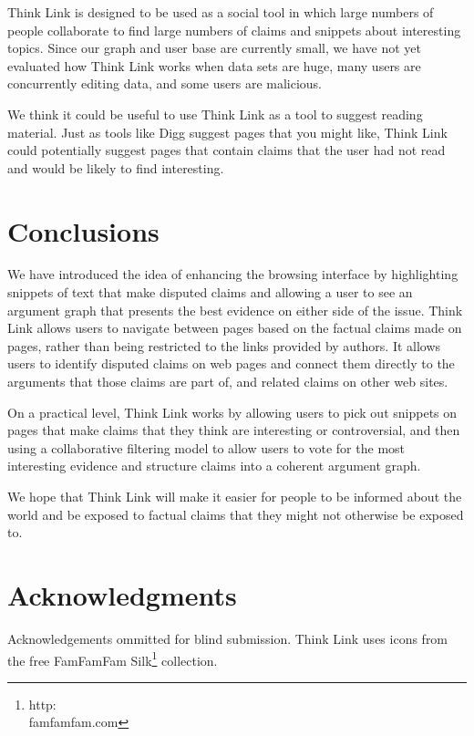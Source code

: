 \documentclass{chi2009}
\newcommand{\todo}[1]{}
\begin{document}
Think Link is designed to be used as a social tool in which large numbers of people collaborate to find large numbers of claims and snippets about interesting topics. Since our graph and user base are currently small, we have not yet evaluated how Think Link works when data sets are huge, many users are concurrently editing data, and some users are malicious.

We think it could be useful to use Think Link as a tool to suggest reading material. Just as tools like Digg suggest pages that you might like, Think Link could potentially suggest pages that contain claims that the user had not read and would be likely to find interesting.

\section{Conclusions}

We have introduced the idea of enhancing the browsing interface by highlighting snippets of text that make disputed claims and allowing a user to see an argument graph that presents the best evidence on either side of the issue. Think Link allows users to navigate between pages based on the factual claims made on pages, rather than being restricted to the links provided by authors. It allows users to identify disputed claims on web pages and connect them directly to the arguments that those claims are part of, and related claims on other web sites.

On a practical level, Think Link works by allowing users to pick out snippets on pages that make claims that they think are interesting or controversial, and then using a collaborative filtering model to allow users to vote for the most interesting evidence and structure claims into a coherent argument graph.

We hope that Think Link will make it easier for people to be informed about the world and be exposed to factual claims that they might not otherwise be exposed to.

\section{Acknowledgments}

Acknowledgements ommitted for blind submission. Think Link uses icons from the free FamFamFam Silk\footnote{http:\\famfamfam.com} collection.


\todo{Sort out bad references}

\end{document}
